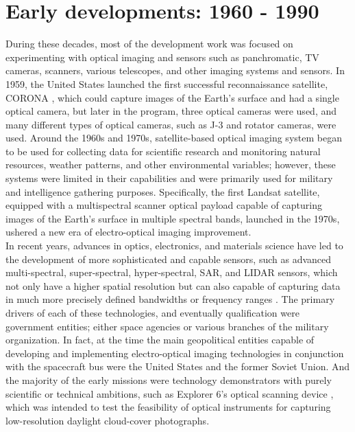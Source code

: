\documentclass[final,5p,times,twocolumn,authoryear]{elsarticle}
\begin{document}
\section{Early developments: 1960 - 1990}
During these decades, most of the development work was focused on experimenting with optical imaging and sensors such as panchromatic, TV cameras, scanners, various telescopes, and other imaging systems and sensors. In 1959, the United States launched the first successful reconnaissance satellite, CORONA \citep{ruffner1995corona}, which could capture images of the Earth's surface and had a single optical camera, but later in the program, three optical cameras were used, and many different types of optical cameras, such as J-3 and rotator cameras, were used. 
Around the 1960s and 1970s, satellite-based optical imaging system began to be used for collecting data for scientific research and monitoring natural resources, weather patterns, and other environmental variables; however, these systems were limited in their capabilities and were primarily used for military and intelligence gathering purposes. Specifically, the first Landsat satellite, equipped with a multispectral scanner optical payload capable of capturing images of the Earth's surface in multiple spectral bands, launched in the 1970s, ushered a new era of electro-optical imaging improvement.\\
In recent years, advances in optics, electronics, and materials science have led to the development of more sophisticated and capable sensors, such as advanced multi-spectral, super-spectral, hyper-spectral, SAR, and LIDAR sensors, which not only have a higher spatial resolution but can also capable of capturing data in much more precisely defined bandwidths or frequency ranges \citep{madry2013electro}. The primary drivers of each of these technologies, and eventually qualification were government entities; either space agencies or various branches of the military organization. In fact, at the time the main geopolitical entities capable of developing and implementing electro-optical imaging technologies in conjunction with the spacecraft bus were the United States and the former Soviet Union. And the majority of the early missions were technology demonstrators with purely scientific or technical ambitions, such as Explorer 6's optical scanning device \citep{judge1962observations}, which was intended to test the feasibility of optical instruments for capturing low-resolution daylight cloud-cover photographs. \\
\end{document}
